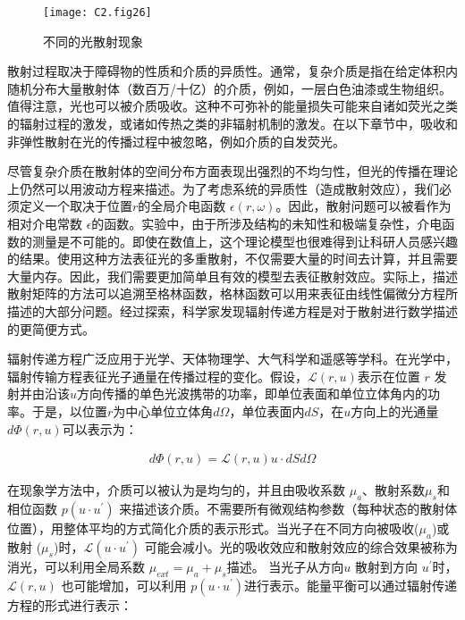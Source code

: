 \begin{figure}[htp]
	\centering
	\texttt{[image: C2.fig26]}
	\caption{不同的光散射现象}
	\label{fig2:26}
\end{figure}

散射过程取决于障碍物的性质和介质的异质性。通常，复杂介质是指在给定体积内随机分布大量散射体（数百万/十亿）的介质，例如，一层白色油漆或生物组织。值得注意，光也可以被介质吸收。这种不可弥补的能量损失可能来自诸如荧光之类的辐射过程的激发，或诸如传热之类的非辐射机制的激发。在以下章节中，吸收和非弹性散射在光的传播过程中被忽略，例如介质的自发荧光。

尽管复杂介质在散射体的空间分布方面表现出强烈的不均匀性，但光的传播在理论上仍然可以用波动方程来描述。为了考虑系统的异质性（造成散射效应），我们必须定义一个取决于位置$r$的全局介电函数 $ \epsilon (r,\omega)$。因此，散射问题可以被看作为相对介电常数 $ \epsilon$的函数。实验中，由于所涉及结构的未知性和极端复杂性，介电函数的测量是不可能的。即使在数值上，这个理论模型也很难得到让科研人员感兴趣的结果。使用这种方法表征光的多重散射，不仅需要大量的时间去计算，并且需要大量内存。因此，我们需要更加简单且有效的模型去表征散射效应。实际上，描述散射矩阵的方法可以追溯至格林函数，格林函数可以用来表征由线性偏微分方程所描述的大部分问题。经过探索，科学家发现辐射传递方程是对于散射进行数学描述的更简便方式。

辐射传递方程广泛应用于光学、天体物理学、大气科学和遥感等学科。在光学中，辐射传输方程表征光子通量在传播过程的变化。假设，$\mathcal{L}(r, u)$表示在位置 $r$ 发射并由沿该$u$方向传播的单色光波携带的功率，即单位表面和单位立体角内的功率。于是，以位置$r$为中心单位立体角$d\Omega$，单位表面内$dS$，在$u$方向上的光通量$d \Phi(r, u)$可以表示为：

\begin{equation}
\begin{aligned}
    d \Phi(r, u) = \mathcal{L}(r, u)u \cdot dS d\Omega
\end{aligned}
\label{eq:2.01}
\end{equation}

在现象学方法中，介质可以被认为是均匀的，并且由吸收系数 $\mu_{a}$、散射系数$\mu_{s}$和相位函数 $p(u·u^{\prime})$ 来描述该介质。不需要所有微观结构参数（每种状态的散射体位置），用整体平均的方式简化介质的表示形式。当光子在不同方向被吸收($\mu_{a}$)或散射 ($\mu_{s}$)时，$\mathcal{L}(u·u^{\prime})$ 可能会减小。光的吸收效应和散射效应的综合效果被称为消光，可以利用全局系数 $\mu_{ext} = \mu_{a} + \mu_{s}$描述。 当光子从方向$u$ 散射到方向 $u^{\prime}$时，$\mathcal{L}(r, u)$ 也可能增加，可以利用 $p(u·u^{\prime})$进行表示。能量平衡可以通过辐射传递方程的形式进行表示：

